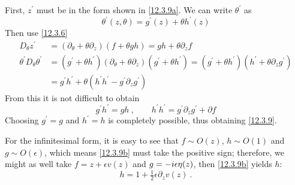 \begin{tcolorbox}[breakable]
	First, $z^{\prime}$ must be in the form shown in \eqref{12.3.9a}. We can write $\theta^{\prime}$ as
	\[
	\theta^{\prime}(z,\theta)=g^{\prime}(z)+\theta h^{\prime}(z)
	\]
	Then use \eqref{12.3.6}
	\begin{align*}
		D_{\theta}z^{\prime} &= (\partial_{\theta}+\theta\partial_{z})(f+\theta gh)= gh+\theta \partial_{z} f \\
		\theta^{\prime}D_{\theta}\theta^{\prime} &=(g^{\prime}+\theta h^{\prime})(\partial_{\theta}+\theta\partial_{z})
		(g^{\prime}+\theta h^{\prime})
		=(g^{\prime}+\theta h^{\prime})(h^{\prime}+\theta \partial_{z} g^{\prime}) \\
		&=g^{\prime}h^{\prime}+\theta (h^{\prime}h^{\prime}-g^{\prime}\partial_{z} g^{\prime})
	\end{align*}
	From this it is not difficult to obtain
	\[
	g^{\prime}h^{\prime}=gh \:, \qquad h^{\prime}h^{\prime}=g^{\prime}\partial_{z} g^{\prime}+\partial f 
	\]
	Choosing $g^{\prime}=g$ and $h^{\prime}=h$ is completely possible, thus obtaining \eqref{12.3.9}.
	
	For the infinitesimal form, it is easy to see that $f\sim O(z)$, $h\sim O(1)$ and $g\sim O(\epsilon)$, which means \eqref{12.3.9b} must take the positive sign; therefore, we might as well take $f=z+\epsilon v(z)$ and $g=-i\epsilon\eta(z)$, then \eqref{12.3.9b} yields $h$:
	\[
	h=1+\tfrac{1}{2}\epsilon\partial_{z}v(z) \:.
	\]
\end{tcolorbox}

